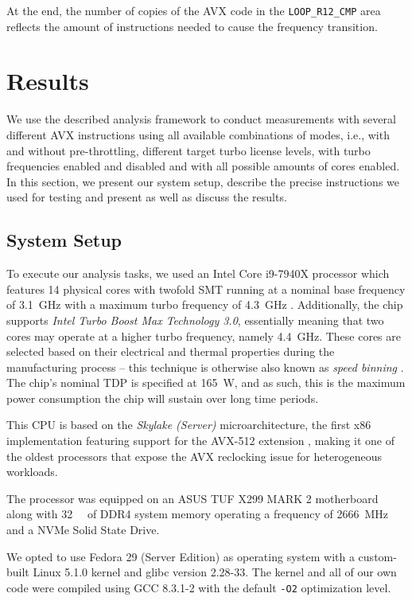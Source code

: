 At the end, the number of copies of the \gls{AVX} code in the \texttt{LOOP\_R12\_CMP} area reflects the amount of instructions needed to cause the frequency transition.

\section{Results}

We use the described analysis framework to conduct measurements with several different \gls{AVX} instructions using all available combinations of modes, i.e., with and without pre-throttling, different target turbo license levels, with turbo frequencies enabled and disabled and with all possible amounts of cores enabled. In this section, we present our system setup, describe the precise instructions we used for testing and present as well as discuss the results.

\subsection{System Setup}

To execute our analysis tasks, we used an Intel Core i9-7940X processor which features 14 physical cores with twofold \gls{SMT} running at a nominal base frequency of \SI{3.1}{\giga\hertz} with a maximum turbo frequency of \SI{4.3}{\giga\hertz} \cite{intel7940x}. Additionally, the chip supports \textit{Intel Turbo Boost Max Technology 3.0}, essentially meaning that two cores may operate at a higher turbo frequency, namely \SI{4.4}{\giga\hertz}. These cores are selected based on their electrical and thermal properties during the manufacturing process \cite{intelxeonscalabledeepdive} -- this technique is otherwise also known as \textit{speed binning} \cite{lopata2012speed}. The chip's nominal \gls{TDP} is specified at \SI{165}{\watt}, and as such, this is the maximum power consumption the chip will sustain over long time periods.

This \gls{CPU} is based on the \textit{Skylake (Server)} microarchitecture, the first x86 implementation featuring support for the \gls{AVX-512} extension \cite{intelxeonscalabledeepdive}, making it one of the oldest processors that expose the \gls{AVX} reclocking issue for heterogeneous workloads.

The processor was equipped on an ASUS TUF X299 MARK 2 motherboard along with \SI{32}{\gibi\byte} of DDR4 system memory operating a frequency of \SI{2666}{\mega\hertz} and a NVMe Solid State Drive.

We opted to use Fedora 29 (Server Edition) as operating system with a custom-built Linux 5.1.0 kernel and glibc version 2.28-33. The kernel and all of our own code were compiled using GCC 8.3.1-2 with the default \texttt{-O2} optimization level.
